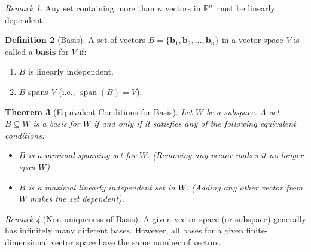 \documentclass[11pt]{article}
\newtheorem{theorem}{Theorem}[section]
\theoremstyle{definition}
\newtheorem{definition}[theorem]{Definition}
\theoremstyle{remark}
\newtheorem{remark}[theorem]{Remark}
\newcommand{\R}{\mathbb{R}}
\newcommand{\Span}{\operatorname{span}}
\begin{document}
\begin{remark}
Any set containing more than $n$ vectors in $\R^n$ must be linearly dependent.
\end{remark}

\begin{definition}[Basis]
A set of vectors $B = \{\mathbf{b}_1, \mathbf{b}_2, \dots, \mathbf{b}_n\}$ in a vector space $V$ is called a \textbf{basis} for $V$ if:
\begin{enumerate}
    \item $B$ is linearly independent.
    \item $B$ spans $V$ (i.e., $\Span(B) = V$).
\end{enumerate}
\end{definition}

\begin{theorem}[Equivalent Conditions for Basis]
Let $W$ be a subspace. A set $B \subseteq W$ is a basis for $W$ if and only if it satisfies any of the following equivalent conditions:
\begin{itemize}
    \item $B$ is a minimal spanning set for $W$. (Removing any vector makes it no longer span $W$).
    \item $B$ is a maximal linearly independent set in $W$. (Adding any other vector from $W$ makes the set dependent).
\end{itemize}
\end{theorem}

\begin{remark}[Non-uniqueness of Basis]
A given vector space (or subspace) generally has infinitely many different bases. However, all bases for a given finite-dimensional vector space have the same number of vectors.
\end{remark}
\end{document}
